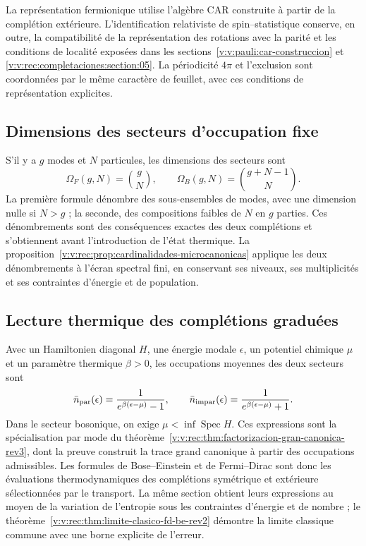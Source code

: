 La représentation fermionique utilise l’algèbre CAR construite à partir de la
complétion extérieure. L’identification relativiste de
spin--statistique conserve, en outre, la compatibilité de la représentation
des rotations avec la parité et les conditions de localité exposées dans
les sections~\ref{v:v:pauli:car-construccion} et
\ref{v:v:rec:completaciones:section:05}. La périodicité \(4\pi\) et
l’exclusion sont coordonnées par le même caractère de feuillet, avec ces
conditions de représentation explicites.

\subsection{Dimensions des secteurs d’occupation fixe}
\label{v:v:rec:completaciones:section:07}

S’il y a \(g\) modes et \(N\) particules, les dimensions des secteurs sont
\begin{equation}
 \Omega_F(g,N)=\binom gN,
 \qquad
 \Omega_B(g,N)=\binom{g+N-1}{N}.
 \label{v:v:ocupacion:eq:dimensiones-sectores}
\end{equation}
La première formule dénombre des sous-ensembles de modes, avec une dimension nulle si
\(N>g\) ; la seconde, des compositions faibles de \(N\) en \(g\) parties.
Ces dénombrements sont des conséquences exactes des deux complétions et
s’obtiennent avant l’introduction de l’état thermique. La
proposition~\ref{v:v:rec:prop:cardinalidades-microcanonicas} applique les deux
dénombrements à l’écran spectral fini, en conservant ses niveaux,
ses multiplicités et ses contraintes d’énergie et de population.

\subsection{Lecture thermique des complétions graduées}
\label{v:v:ocupacion:lectura-termica}

Avec un Hamiltonien diagonal \(H\), une énergie modale \(\epsilon\), un potentiel
chimique \(\mu\) et un paramètre thermique \(\beta>0\), les occupations moyennes
des deux secteurs sont
\begin{equation}
 \bar n_{\rm par}(\epsilon)
 =\frac{1}{e^{\beta(\epsilon-\mu)}-1},
 \qquad
 \bar n_{\rm impar}(\epsilon)
 =\frac{1}{e^{\beta(\epsilon-\mu)}+1}.
 \label{v:v:ocupacion:eq:leyes-por-modo}
\end{equation}
Dans le secteur bosonique, on exige \(\mu<\inf\operatorname{Spec}H\).
Ces expressions sont la spécialisation par mode du
théorème~\ref{v:v:rec:thm:factorizacion-gran-canonica-rev3}, dont la preuve
construit la trace grand canonique à partir des occupations admissibles.
Les formules de Bose--Einstein et de Fermi--Dirac sont donc les
évaluations thermodynamiques des complétions symétrique et extérieure
sélectionnées par le transport. La même section obtient leurs expressions
au moyen de la variation de l’entropie sous les contraintes d’énergie et de
nombre ; le théorème~\ref{v:v:rec:thm:limite-clasico-fd-be-rev2} démontre la
limite classique commune avec une borne explicite de l’erreur.
